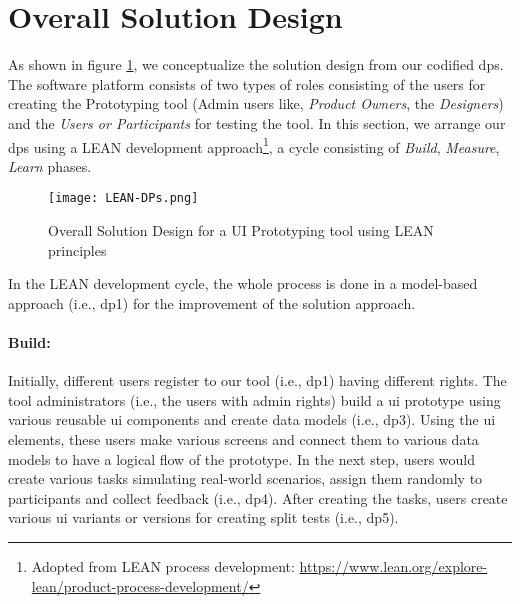 \clearpage
\section{Overall Solution Design}
\label{design:section:solutiondesign}
As shown in figure \ref{fig:design:lean}, we conceptualize the solution design from our codified \ac{dp}s.
The software platform consists of two types of roles consisting of the users for creating the Prototyping tool (Admin users like, \textit{Product Owners}, the \textit{Designers}) and the \textit{Users or Participants} for testing the tool.
In this section, we arrange our \ac{dp}s using a LEAN development approach\footnote{Adopted from LEAN process development: \url{https://www.lean.org/explore-lean/product-process-development/}}, a cycle consisting of \textit{Build}, \textit{Measure}, \textit{Learn} phases.

\begin{figure}[htbp!]
  \centering    
  \texttt{[image: LEAN-DPs.png]}
  \caption[Solution Concept]{Overall Solution Design for a UI Prototyping tool using LEAN principles}
  \label{fig:design:lean}
\end{figure}

In the LEAN development cycle, the whole process is done in a model-based approach (i.e., \ac{dp}1) for the improvement of the solution approach.
\paragraph{Build:}
\label{design:paragraph:build}
Initially, different users register to our tool (i.e., \ac{dp}1) having different rights. 
The tool administrators (i.e., the users with admin rights) build a \ac{ui} prototype using various reusable \ac{ui} components and create data models (i.e., \ac{dp}3). 
Using the \ac{ui} elements, these users make various screens and connect them to various data models to have a logical flow of the prototype.
In the next step, users would create various tasks simulating real-world scenarios, assign them randomly to participants and collect feedback (i.e., \ac{dp}4).
After creating the tasks, users create various \ac{ui} variants or versions for creating split tests (i.e., \ac{dp}5).

